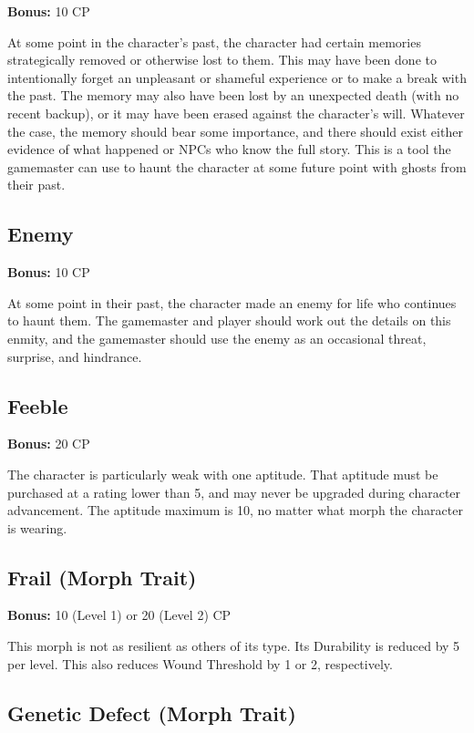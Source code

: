 \textbf{Bonus:} 10 CP

At some point in the character’s past, the character had certain memories strategically removed or otherwise lost to them. This may have been done to intentionally forget an unpleasant or shameful experience or to make a break with the past. The memory may also have been lost by an unexpected death (with no recent backup), or it may have been erased against the character’s will. Whatever the case, the memory should bear some importance, and there should exist either evidence of what happened or NPCs who know the full story. This is a tool the gamemaster can use to haunt the character at some future point with ghosts from their past.

\subsection{Enemy}
\label{sec:traits-enemy}

\textbf{Bonus:} 10 CP

At some point in their past, the character made an enemy for life who continues to haunt them. The gamemaster and player should work out the details on this enmity, and the gamemaster should use the enemy as an occasional threat, surprise, and hindrance.

\subsection{Feeble}
\label{sec:traits-feeble}

\textbf{Bonus:} 20 CP

The character is particularly weak with one aptitude. That aptitude must be purchased at a rating lower than 5, and may never be upgraded during character advancement. The aptitude maximum is 10, no matter what morph the character is wearing.

\subsection{Frail (Morph Trait)}
\label{sec:traits-frail}

\textbf{Bonus:} 10 (Level 1) or 20 (Level 2) CP

This morph is not as resilient as others of its type. Its Durability is reduced by 5 per level. This also reduces Wound Threshold by 1 or 2, respectively.

\subsection{Genetic Defect (Morph Trait)}
\label{sec:traits-genetic-defect}

